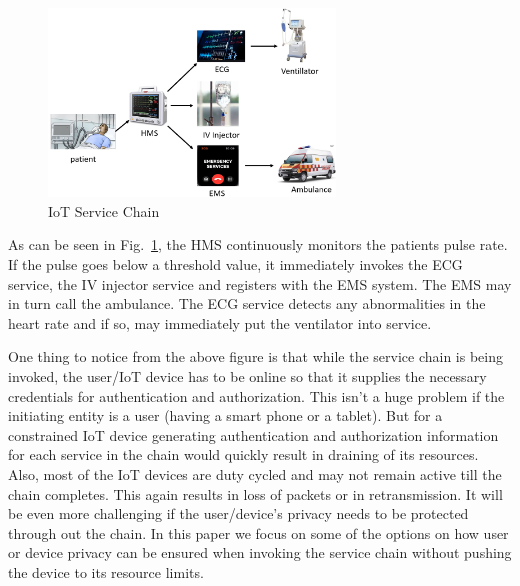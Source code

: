 \documentclass[journal]{IEEEtran}
\begin{document}
\begin{figure}[htbp]
\centerline{\includegraphics[width=3in]{chain.png}}
\caption{IoT Service Chain}
\label{fig:iotsvc}
\end{figure}

As can be seen in Fig.~\ref{fig:iotsvc}, the HMS continuously monitors the patients pulse rate. If the pulse goes below a threshold value, it immediately invokes the ECG service, the IV injector service and registers with the EMS system. The EMS may in turn call the ambulance. The ECG service detects any abnormalities in the heart rate and if so, may immediately put the ventilator into service.

One thing to notice from the above figure is that while the service chain is being invoked, the user/IoT device has to be online so that it supplies the necessary credentials for authentication and authorization.  This isn't a huge problem if the initiating entity is a user (having a smart phone or a tablet). But for a constrained IoT device generating authentication and authorization information for each service in the chain would quickly result in draining of its resources. Also, most of the IoT devices are duty cycled and may not remain active till the chain completes. This again results in loss of packets or in retransmission. It will be even more challenging if the user/device's privacy needs to be protected through out the chain. In this paper we focus on some of the options on how user or device privacy can be ensured when invoking the service chain without pushing the device to its resource limits.
\end{document}
